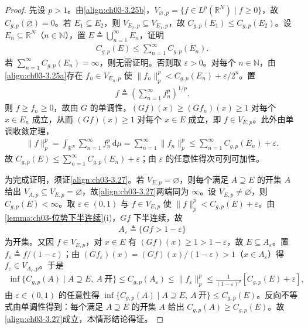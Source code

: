 \documentclass[../../main.tex]{subfiles}%
\begin{document}
\begin{proof}
先设 $p>1$。由\eqref{align:ch03-3.25b}，$V_{\varnothing,p}=\{f\in L^p(\mathbb{R}^N)\mid f\geqslant0\}$，故 $C_{g,p}(\varnothing)=0$。若 $E_1\subseteq E_2$，则 $V_{E_2,p}\subseteq V_{E_1,p}$，故 $C_{g,p}(E_1)\leqslant C_{g,p}(E_2)$。设 $E_n\subseteq\mathbb{R}^N$（$n\in\mathbb{N}$），置 $E\triangleq\bigcup_{n=1}^\infty E_n$，证明
\begin{align*}
C_{g,p}(E)\leqslant\sum_{n=1}^\infty C_{g,p}(E_n).
\end{align*}
若 $\sum_{n=1}^\infty C_{g,p}(E_n)=\infty$，则无需证明。否则取 $\varepsilon>0$。对每个 $n\in\mathbb{N}$，由\eqref{align:ch03-3.25a}存在 $f_n\in V_{E_n,p}$ 使 $\|f_n\|_p^p<C_{g,p}(E_n)+\varepsilon/2^n$。置
\begin{align*}
f\triangleq\left(\sum_{n=1}^\infty f_n^p\right)^{1/p}.
\end{align*}
则 $f\geqslant f_n\geqslant0$，故由 $G$ 的单调性，$(Gf)(x)\geqslant(Gf_n)(x)\geqslant1$ 对每个 $x\in E_n$ 成立，从而 $(Gf)(x)\geqslant1$ 对每个 $x\in E$ 成立，即 $f\in V_{E,p}$。此外由单调收敛定理，
\begin{align*}
\|f\|_p^p=\int_{\mathbb{R}^N}\sum_{n=1}^\infty f_n^p\,\mathrm{d}\mu=\sum_{n=1}^\infty\|f_n\|_p^p\leqslant\sum_{n=1}^\infty C_{g,p}(E_n)+\varepsilon.
\end{align*}
故 $C_{g,p}(E)\leqslant\sum_{n=1}^\infty C_{g,p}(E_n)+\varepsilon$；由 $\varepsilon$ 的任意性得次可列可加性。

为完成证明，须证\eqref{align:ch03-3.27}。若 $V_{E,p}=\varnothing$，则每个满足 $A\supseteq E$ 的开集 $A$ 给出 $V_{A,p}\subseteq V_{E,p}=\varnothing$，故\eqref{align:ch03-3.27}两端同为 $\infty$。设 $V_{E,p}\neq\varnothing$，则 $C_{g,p}(E)<\infty$。取 $\varepsilon\in(0,1)$ 与 $f\in V_{E,p}$ 使 $\|f\|_p^p<C_{g,p}(E)+\varepsilon$。由\cref{lemma:ch03-位势下半连续}(i)，$Gf$ 下半连续，故
\begin{align*}
A_\varepsilon\triangleq\{Gf>1-\varepsilon\}
\end{align*}
为开集。又因 $f\in V_{E,p}$，对 $x\in E$ 有 $(Gf)(x)\geqslant1>1-\varepsilon$，故 $E\subseteq A_\varepsilon$。置 $f_\varepsilon\triangleq f/(1-\varepsilon)$；由 $(Gf_\varepsilon)(x)=(Gf)(x)/(1-\varepsilon)>1$（$x\in A_\varepsilon$）得 $f_\varepsilon\in V_{A_\varepsilon,p}$。于是
\begin{align*}
\inf\{C_{g,p}(A)\mid A\supseteq E,\ A\ \text{开}\}\leqslant C_{g,p}(A_\varepsilon)\leqslant\|f_\varepsilon\|_p^p\leqslant\frac{1}{(1-\varepsilon)^p}\left[C_{g,p}(E)+\varepsilon\right],
\end{align*}
由 $\varepsilon\in(0,1)$ 的任意性得 $\inf\{C_{g,p}(A)\mid A\supseteq E,\ A\ \text{开}\}\leqslant C_{g,p}(E)$。反向不等式由单调性得到：每个满足 $A\supseteq E$ 的开集 $A$ 给出 $C_{g,p}(A)\geqslant C_{g,p}(E)$。故\eqref{align:ch03-3.27}成立，本情形结论得证。


\end{proof}
\end{document}
